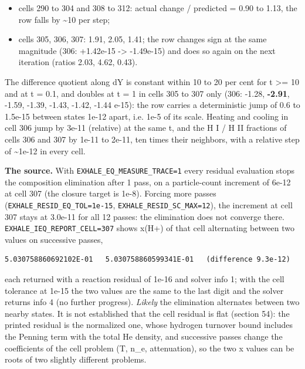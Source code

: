 \documentclass[english,a4paper]{my_memo}
\providecommand{\tightlist}{\setlength{\itemsep}{0pt}\setlength{\parskip}{0pt}}
\begin{document}
\begin{itemize}
\tightlist
\item
  cells 290 to 304 and 308 to 312: actual change / predicted = 0.90 to
  1.13, the row falls by \textasciitilde10 per step;
\item
  cells 305, 306, 307: 1.91, 2.05, 1.41; the row changes sign at the same
  magnitude (306: +1.42e-15 -\textgreater{} -1.49e-15) and does so again on the next
  iteration (ratios 2.03, 4.62, 0.43).
\end{itemize}

The difference quotient along dY is constant within 10 to 20 per cent for
t \textgreater= 10 and at t = 0.1, and doubles at t = 1 in cells 305 to 307 only
(306: -1.28, \textbf{-2.91}, -1.59, -1.39, -1.43, -1.42, -1.44 e-15): the row
carries a deterministic jump of 0.6 to 1.5e-15 between states 1e-12 apart,
i.e. 1e-5 of its scale. Heating and cooling in cell 306 jump by 3e-11
(relative) at the same t, and the H I / H II fractions of cells 306 and 307
by 1e-11 to 2e-11, ten times their neighbors\textquotesingle, with a relative step of
\textasciitilde1e-12 in every cell.

\textbf{The source.} With \texttt{EXHALE\_EQ\_MEASURE\_TRACE=1} every residual evaluation
stops the composition elimination after 1 pass, on a particle-count
increment of 6e-12 at cell 307 (the closure target is 1e-8). Forcing more
passes (\texttt{EXHALE\_RESID\_EQ\_TOL=1e-15}, \texttt{EXHALE\_RESID\_SC\_MAX=12}), the
increment at cell 307 stays at 3.0e-11 for all 12 passes: the elimination
does not converge there. \texttt{EXHALE\_IEQ\_REPORT\_CELL=307} shows x(H+) of that
cell alternating between two values on successive passes,

\begin{verbatim}
5.030758860692102E-01   5.030758860599341E-01   (difference 9.3e-12)
\end{verbatim}

each returned with a reaction residual of 1e-16 and solver info 1; with the
cell tolerance at 1e-15 the two values are the same to the last digit
and the solver returns info 4 (no further progress). \emph{Likely} the elimination alternates between two nearby states. It is
not established that the cell residual is flat (section 54): the
printed residual is the normalized one, whose hydrogen turnover bound
includes the Penning term with the total He density, and successive
passes change the coefficients of the cell problem (T, n\_e, attenuation),
so the two x values can be roots of two slightly different problems.
\end{document}
